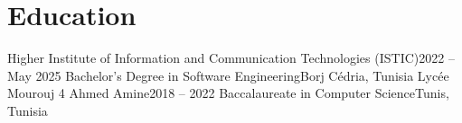 \section{Education}
\resumeSubHeadingListStart

\resumeSubheading
{Higher Institute of Information and Communication Technologies (ISTIC)}{2022 -- May 2025}
{Bachelor’s Degree in Software Engineering}{Borj Cédria, Tunisia} 
\vspace{0.2cm}
\resumeSubheading
{Lycée Mourouj 4 Ahmed Amine}{2018 -- 2022}
{Baccalaureate in Computer Science}{Tunis, Tunisia}

\resumeSubHeadingListEnd
